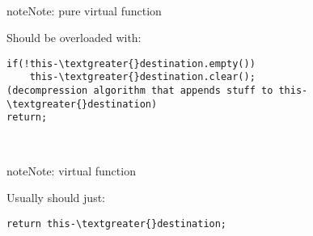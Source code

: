 \documentclass[letterpaper,10pt,english]{sphinxmanual}
\begin{document}
\begin{fulllineitems}
\label{compression:compression::uncompress__uint8_tP.s}~
\begin{notice}{note}{Note:}
pure virtual function
\end{notice}

Should be overloaded with:

\begin{Verbatim}[commandchars=\\\{\}]
if(!this-\textgreater{}destination.empty())
    this-\textgreater{}destination.clear();
(decompression algorithm that appends stuff to this-\textgreater{}destination)
return;
\end{Verbatim}

\end{fulllineitems}


\begin{fulllineitems}
\label{compression:compression::output_raw}~
\begin{notice}{note}{Note:}
virtual function
\end{notice}

Usually should just:

\begin{Verbatim}[commandchars=\\\{\}]
return this-\textgreater{}destination;
\end{Verbatim}

\end{fulllineitems}

\end{document}
